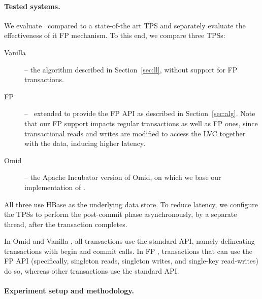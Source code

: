 

\paragraph{Tested systems.}

We evaluate \sys\ compared to a state-of-the art TPS and separately evaluate the effectiveness of it FP mechanism.
To this end, we compare three TPSs: 
\begin{description}
\item[Vanilla \sys] -- the algorithm described in Section~\ref{sec:ll}, without support for FP transactions.
\item[FP \sys] -- \sys\ extended to provide the FP API as described in Section~\ref{sec:alg}. Note that 
our FP support impacts regular transactions as well as FP ones,
since transactional reads and writes are modified to access the LVC together with the data, 
inducing higher latency.
\item[Omid] -- the Apache Incubator version of Omid, on which we base
our implementation of \sys. 
\end{description}

All three use HBase as the underlying data store. To reduce latency,
we configure the TPSs to perform the post-commit phase asynchronously, 
by a separate thread, after the transaction completes.

In Omid and Vanilla \sys, all transactions use the standard API, namely 
delineating transactions with begin and commit calls.
In FP \sys, transactions that can use the FP API (specifically, singleton reads, singleton writes, 
and single-key read-writes) do so, whereas other transactions use the standard API.

\paragraph{Experiment setup and methodology.}

